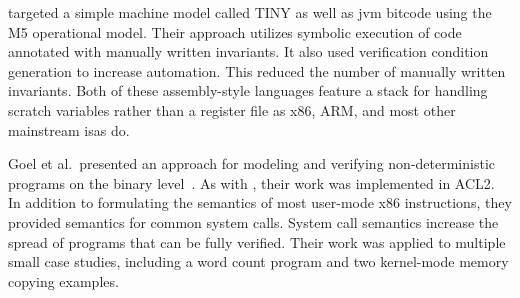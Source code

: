 \citet{matthews2006verification} targeted a simple machine model called TINY
as well as \ac{jvm} bitcode using the M5 operational model.
Their approach utilizes symbolic execution of code annotated
with manually written invariants.
It also used verification condition generation to increase automation.
This reduced the number of manually written invariants.
Both of these assembly-style languages feature a stack
for handling scratch variables rather than a register file
as x86, ARM, and most other mainstream \acp{isa} do.

Goel et al.\ presented an approach for modeling and verifying
non-deterministic programs on the binary level~\citep{goel2014syscalls,goelphd}.
As with \citet{matthews2006verification}, their work was implemented in ACL2.
In addition to formulating the semantics of most user-mode x86 instructions,
they provided semantics for common system calls.
System call semantics increase the spread of programs that can be fully verified.
Their work was applied to multiple small case studies,
including a word count program and two kernel-mode memory copying examples.

